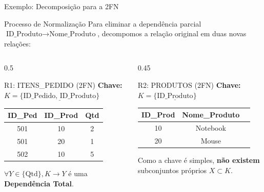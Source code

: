 \documentclass[9pt]{beamer}
\begin{document}
\begin{frame}{Exemplo: Decomposição para a 2FN}
\small

\begin{block}{Processo de Normalização}
Para eliminar a dependência parcial $\text{ID\_Produto} \rightarrow \text{Nome\_Produto}$, decompomos a relação original em duas novas relações:
\end{block}

\vspace{0.2cm}

\begin{columns}[t]
    \begin{column}{0.5\textwidth}
        \begin{exampleblock}{R1: ITENS\_PEDIDO (2FN)}
        \textbf{Chave:} $K = \{\underline{\text{ID\_Pedido, ID\_Produto}}\}$
        
        \centering
        \vspace{0.1cm}
        \begin{tabular}{|c|c|c|}
        \hline
        \textbf{ID\_Ped} & \textbf{ID\_Prod} & \textbf{Qtd} \\
        \hline
        501 & 10 & 2 \\
        501 & 20 & 1 \\
        502 & 10 & 5 \\
        \hline
        \end{tabular}
        \vspace{0.2cm}
        \flushleft
        \scriptsize $\forall Y \in \{\text{Qtd}\}, K \rightarrow Y$ é uma \textbf{Dependência Total}.
        \end{exampleblock}
    \end{column}

    \begin{column}{0.45\textwidth}
        \begin{exampleblock}{R2: PRODUTOS (2FN)}
        \textbf{Chave:} $K = \{\underline{\text{ID\_Produto}}\}$
        
        \centering
        \vspace{0.1cm}
        \begin{tabular}{|c|c|l|}
        \hline
        \textbf{ID\_Prod} & \textbf{Nome\_Produto} \\
        \hline
        10 & Notebook \\
        20 & Mouse \\
        \hline
        \end{tabular}
        \vspace{0.2cm}
        \flushleft
        \scriptsize Como a chave é simples, \textbf{não existem} subconjuntos próprios $X \subset K$.
        \end{exampleblock}
    \end{column}
\end{columns}


\end{frame}
\end{document}
